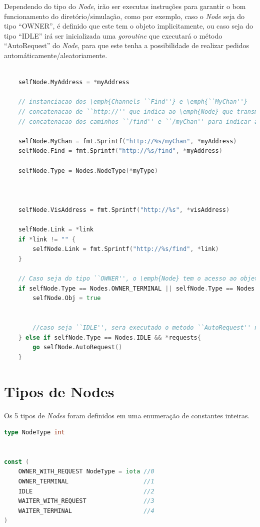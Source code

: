 Dependendo do tipo do \emph{Node}, irão ser executas instruções para garantir o bom funcionamento do diretório/simulação,
como por exemplo, caso o \emph{Node} seja do tipo ``OWNER'', é definido que este tem o objeto implicitamente, ou
caso seja do tipo ``IDLE'' irá ser inicializada uma \emph{goroutine} que executará o método ``AutoRequest'' do \emph{Node},
para que este tenha a possibilidade de realizar pedidos automáticamente/aleatoriamente.

\begin{lstlisting}[caption={\emph{Switch} de decisão do comportamento.},language=Go]

	selfNode.MyAddress = *myAddress

	// instanciacao dos \emph{Channels ``Find''} e \emph{``MyChan''}
	// concatenacao de ``http://'' que indica ao \emph{Node} que transmitira o pedido que este deve ser um pedido \acs{HTTP}
	// concatenacao dos caminhos ``/find'' e ``/myChan'' para indicar aos \emph{Nodes} para que \emph{Channel} sera enviado

	selfNode.MyChan = fmt.Sprintf("http://%s/myChan", *myAddress)
	selfNode.Find = fmt.Sprintf("http://%s/find", *myAddress)

	selfNode.Type = Nodes.NodeType(*myType)



	selfNode.VisAddress = fmt.Sprintf("http://%s", *visAddress)

	selfNode.Link = *link
	if *link != "" {
		selfNode.Link = fmt.Sprintf("http://%s/find", *link)
	}

	// Caso seja do tipo ``OWNER'', o \emph{Node} tem o acesso ao objeto
	if selfNode.Type == Nodes.OWNER_TERMINAL || selfNode.Type == Nodes.OWNER_WITH_REQUEST {
		selfNode.Obj = true


		//caso seja ``IDLE'', sera executado o metodo ``AutoRequest'' numa nova \emph{Goroutine}
	} else if selfNode.Type == Nodes.IDLE && *requests{ 
		go selfNode.AutoRequest()
	}

\end{lstlisting}


\section{Tipos de Nodes}
\label{chap:imp:node:tipos}

Os 5 tipos de \emph{Nodes} foram definidos em uma enumeração de constantes inteiras.
\begin{lstlisting}[caption={\emph{Switch} de decisão do comportamento.},language=Go]
type NodeType int


const (
	OWNER_WITH_REQUEST NodeType = iota //0
	OWNER_TERMINAL                     //1
	IDLE                               //2
	WAITER_WITH_REQUEST                //3
	WAITER_TERMINAL					   //4
)

\end{lstlisting}

